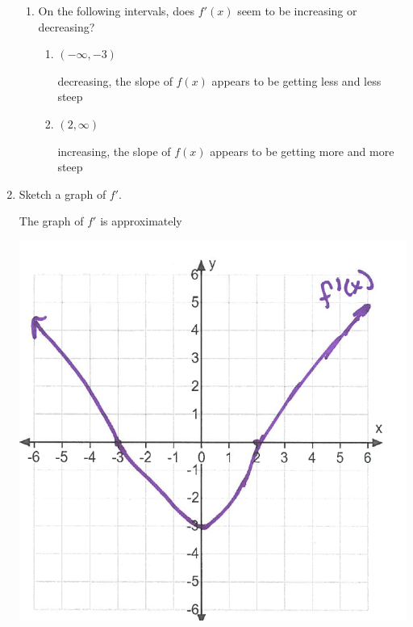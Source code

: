 \documentclass[nooutcomes]{ximera}
\begin{document}
\begin{problem}
\begin{enumerate}
\begin{enumerate}
        \item
          On the following intervals, does $f'(x)$ seem to be increasing or decreasing?
         
            \begin{enumerate}
		\item $(-\infty,-3)$
			 \begin{freeResponse}
				decreasing, the slope of $f(x)$ appears to be getting less and less steep
			  \end{freeResponse}
		\item $(2,\infty)$
			 \begin{freeResponse}
				increasing, the slope of $f(x)$ appears to be getting more and more steep
			  \end{freeResponse}
	\end{enumerate}

      \end{enumerate}

      \item
      Sketch a graph of $f'$.
      \begin{freeResponse}
        The graph of $f'$ is approximately
        \begin{image}
          \includegraphics[scale = 0.5]{Figure2.png}
        \end{image}
      \end{freeResponse}
  \end{enumerate}
\end{problem}
\end{document}
